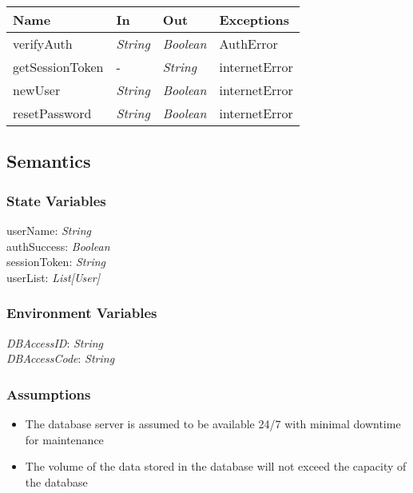 \documentclass[12pt, titlepage]{article}
\begin{document}
\begin{center}
\begin{tabular}{p{4cm} p{3cm} p{3cm} p{3cm}}
\hline
\textbf{Name} & \textbf{In} & \textbf{Out} & \textbf{Exceptions} \\
\hline
verifyAuth&  \textit{String} & \textit{Boolean} & AuthError \\
getSessionToken&  - & \textit{String} & internetError \\
newUser&  \textit{String} & \textit{Boolean} & internetError \\
resetPassword&  \textit{String} & \textit{Boolean} & internetError \\

\hline
\end{tabular}
\end{center}

\subsection{Semantics}

\subsubsection{State Variables}

userName: \textit{String}\\
authSuccess: \textit{Boolean}\\
sessionToken: \textit{String}\\
userList: \textit{List[User]}

\subsubsection{Environment Variables}

\textit{DBAccessID}: \textit{String}\\
\textit{DBAccessCode}: \textit{String}

\subsubsection{Assumptions}

\begin{itemize}
  \item The database server is assumed to be available 24/7 with minimal downtime for maintenance 
  \item The volume of the data stored in the database will not exceed the capacity of the database
\end{itemize}
\end{document}
